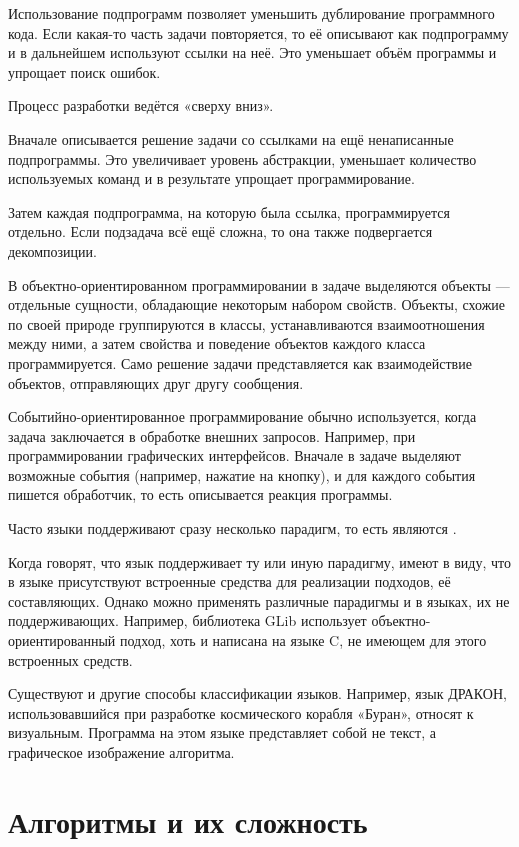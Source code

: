 Использование подпрограмм позволяет уменьшить дублирование
программного кода. Если какая-то часть задачи повторяется, то её
описывают как подпрограмму и в дальнейшем используют ссылки на
неё. Это уменьшает объём программы и упрощает поиск ошибок.

Процесс разработки ведётся «сверху вниз».

Вначале описывается решение задачи со ссылками на ещё ненаписанные
подпрограммы. Это увеличивает уровень абстракции, уменьшает количество
используемых команд и в результате упрощает программирование.

Затем каждая подпрограмма, на которую была ссылка, программируется
отдельно. Если подзадача всё ещё сложна, то она также подвергается
декомпозиции.

В объектно-ориентированном программировании в задаче выделяются
объекты — отдельные сущности, обладающие некоторым набором
свойств. Объекты, схожие по своей природе группируются в классы,
устанавливаются взаимоотношения между ними, а затем свойства и
поведение объектов каждого класса программируется.  Само решение
задачи представляется как взаимодействие объектов, отправляющих друг
другу сообщения.

Событийно-ориентированное программирование обычно используется, когда
задача заключается в обработке внешних запросов. Например, при
программировании графических интерфейсов. Вначале в задаче выделяют
возможные события (например, нажатие на кнопку), и для каждого события
пишется обработчик, то есть описывается реакция программы.

Часто языки поддерживают сразу несколько парадигм, то есть являются
.

Когда говорят, что язык поддерживает ту или иную парадигму, имеют в
виду, что в языке присутствуют встроенные средства для реализации
подходов, её составляющих. Однако можно применять различные парадигмы
и в языках, их не поддерживающих. Например, библиотека GLib использует
объектно-ориентированный подход, хоть и написана на языке C, не
имеющем для этого встроенных средств.

Существуют и другие способы классификации языков. Например, язык
ДРАКОН, использовавшийся при разработке космического корабля «Буран»,
относят к визуальным. Программа на этом языке представляет собой не
текст, а графическое изображение алгоритма.

\section{Алгоритмы и их сложность}

